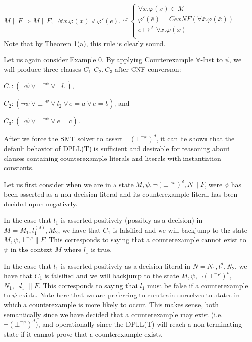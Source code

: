 \documentclass{llncs}
\begin{document}
$M \parallel F \Longrightarrow M \parallel F, \neg \forall \bar{x}. \varphi( \bar{ x } ) \vee \varphi'( \bar{ e } )$, if   
$\begin{cases}
  \forall \bar{x}. \varphi( \bar{ x } ) \in M \\
  \varphi'( \bar{ e } ) = CexNF( \forall \bar{x}. \varphi( \bar{ x } ) ) \\
  \bar{ e } \mapsto^A \forall \bar{x}. \varphi( \bar{ x } ) \\
\end{cases}$ \\

Note that by Theorem 1(a), this rule is clearly sound.

Let us again consider Example 0.
By applying Counterexample $\forall$-Inst to $\psi$, we will produce three clauses $C_1, C_2, C_3$ after CNF-conversion:

$C_1 : ( \neg \psi \vee \bot^{\neg \psi} \vee \neg l_1)$,

$C_2 : ( \neg \psi \vee \bot^{\neg \psi} \vee l_2 \vee e = a \vee e = b )$, and

$C_3 : ( \neg \psi \vee \bot^{\neg \psi} \vee e = c )$.

After we force the SMT solver to assert $\neg( \bot^{\neg \varphi} )^d$, it can be shown that the default behavior of DPLL(T) is sufficient and desirable for reasoning about clauses containing counterexample literals and literals with instantiation constants.

Let us first consider when we are in a state $M, \psi, \neg( \bot^{\neg \varphi} )^d, N \parallel F$, were $\psi$ has been asserted as a non-decision literal and its counterexample literal has been decided upon negatively.

In the case that $l_1$ is asserted positively (possibly as a decision) in $M = M_1, l^{(d)}_1, M_2$, we have that $C_1$ is falsified and we will backjump to the state $M, \psi, \bot^{\neg \varphi} \parallel F$.
This corresponds to saying that a counterexample cannot exist to $\psi$ in the context $M$ where $l_1$ is true.

In the case that $l_1$ is asserted positively as a decision literal in $N = N_1, l^d_1, N_2$, we have that $C_1$ is falsified and we will backjump to the state $M, \psi, \neg( \bot^{\neg \varphi} )^d,$ $N_1, \neg l_1$ $\parallel F$.
This corresponds to saying that $l_1$ must be false if a counterexample to $\psi$ exists.
Note here that we are preferring to constrain ourselves to states in which a counterexample is more likely to occur.
This makes sense, both semantically since we have decided that a counterexample may exist (i.e. $\neg( \bot^{\neg \varphi} )^d$), and operationally since the DPLL(T) will reach a non-terminating state if it cannot prove that a counterexample exists.
\end{document}
